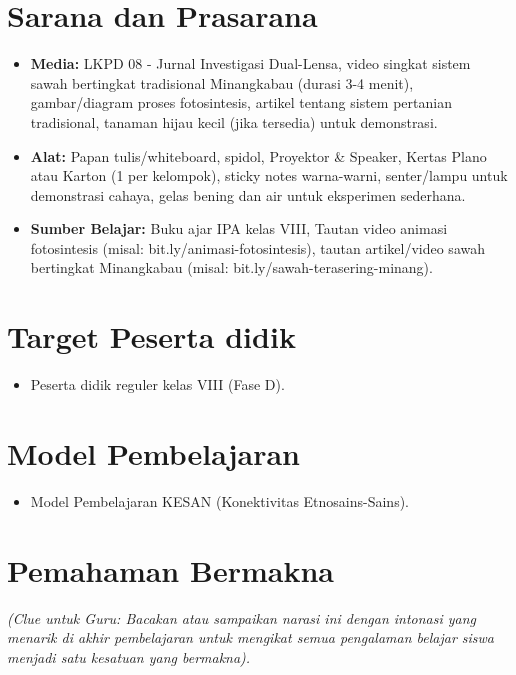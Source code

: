 \documentclass[a4paper,12pt]{article}
\begin{document}
\section{Sarana dan Prasarana}

\begin{itemize}
\item \textbf{Media:} LKPD 08 - Jurnal Investigasi Dual-Lensa, video singkat sistem sawah bertingkat tradisional Minangkabau (durasi 3-4 menit), gambar/diagram proses fotosintesis, artikel tentang sistem pertanian tradisional, tanaman hijau kecil (jika tersedia) untuk demonstrasi.
\item \textbf{Alat:} Papan tulis/whiteboard, spidol, Proyektor \& Speaker, Kertas Plano atau Karton (1 per kelompok), sticky notes warna-warni, senter/lampu untuk demonstrasi cahaya, gelas bening dan air untuk eksperimen sederhana.
\item \textbf{Sumber Belajar:} Buku ajar IPA kelas VIII, Tautan video animasi fotosintesis (misal: bit.ly/animasi-fotosintesis), tautan artikel/video sawah bertingkat Minangkabau (misal: bit.ly/sawah-terasering-minang).
\end{itemize}

\section{Target Peserta didik}

\begin{itemize}
\item Peserta didik reguler kelas VIII (Fase D).
\end{itemize}

\section{Model Pembelajaran}

\begin{itemize}
\item Model Pembelajaran KESAN (Konektivitas Etnosains-Sains).
\end{itemize}

\section{Pemahaman Bermakna}
\textit{(Clue untuk Guru: Bacakan atau sampaikan narasi ini dengan intonasi yang menarik di akhir pembelajaran untuk mengikat semua pengalaman belajar siswa menjadi satu kesatuan yang bermakna).}
\end{document}
